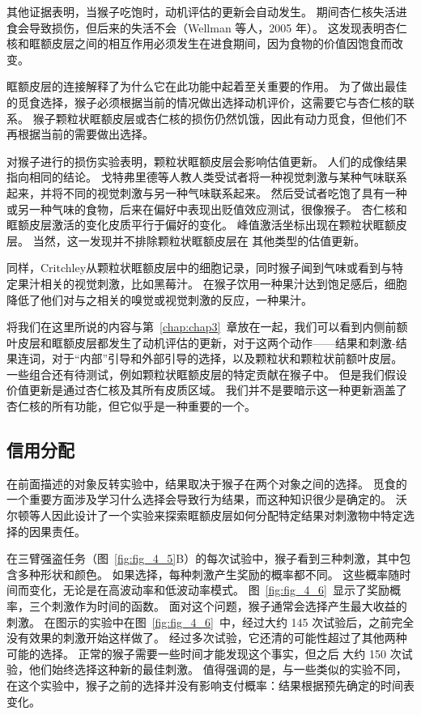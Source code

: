 其他证据表明，当猴子吃饱时，动机评估的更新会自动发生。
期间杏仁核失活进食会导致损伤，但后来的失活不会（Wellman 等人，2005 年）。
这发现表明杏仁核和眶额皮层之间的相互作用必须发生在进食期间，因为食物的价值因饱食而改变。\par


眶额皮层的连接解释了为什么它在此功能中起着至关重要的作用。
为了做出最佳的觅食选择，猴子必须根据当前的情况做出选择动机评价，这需要它与杏仁核的联系。
猴子颗粒状眶额皮层或杏仁核的损伤仍然饥饿，因此有动力觅食，但他们不再根据当前的需要做出选择。\par


对猴子进行的损伤实验表明，颗粒状眶额皮层会影响估值更新。
人们的成像结果指向相同的结论。
戈特弗里德等人\cite{gottfried2003encoding}教人类受试者将一种视觉刺激与某种气味联系起来，并将不同的视觉刺激与另一种气味联系起来。
然后受试者吃饱了具有一种或另一种气味的食物，后来在偏好中表现出贬值效应测试，很像猴子。
杏仁核和眶额皮层激活的变化皮质平行于偏好的变化。
峰值激活坐标出现在颗粒状眶额皮层。
当然，这一发现并不排除颗粒状眶额皮层在
其他类型的估值更新。\par


同样，Critchley\cite{critchley1996hunger}从颗粒状眶额皮层中的细胞记录，同时猴子闻到气味或看到与特定果汁相关的视觉刺激，比如黑莓汁。
在猴子饮用一种果汁达到饱足感后，细胞降低了他们对与之相关的嗅觉或视觉刺激的反应，一种果汁。\par


将我们在这里所说的内容与第~\ref{chap:chap3}~章放在一起，我们可以看到内侧前额叶皮层和眶额皮层都发生了动机评估的更新，对于这两个动作——结果和刺激-结果连词，对于“内部”引导和外部引导的选择，以及颗粒状和颗粒状前额叶皮层。
一些组合还有待测试，例如颗粒状眶额皮层的特定贡献在猴子中。
但是我们假设价值更新是通过杏仁核及其所有皮质区域。
我们并不是要暗示这一种更新涵盖了杏仁核的所有功能，但它似乎是一种重要的一个。\par



\subsection{信用分配}

在前面描述的对象反转实验中，结果取决于猴子在两个对象之间的选择。
觅食的一个重要方面涉及学习什么选择会导致行为结果，而这种知识很少是确定的。
沃尔顿等人\cite{walton2010separable}因此设计了一个实验来探索眶额皮层如何分配特定结果对刺激物中特定选择的因果责任。\par


在三臂强盗任务（图~\ref{fig:fig_4_5}B）的每次试验中，猴子看到三种刺激，其中包含多种形状和颜色。
如果选择，每种刺激产生奖励的概率都不同。
这些概率随时间而变化，无论是在高波动率和低波动率模式。
图~\ref{fig:fig_4_6}~显示了奖励概率，三个刺激作为时间的函数。
面对这个问题，猴子通常会选择产生最大收益的刺激。
在图示的实验中在图~\ref{fig:fig_4_6}~中，经过大约 145 次试验后，之前完全没有效果的刺激开始这样做了。
经过多次试验，它还清的可能性超过了其他两种可能的选择。
正常的猴子需要一些时间才能发现这个事实，但之后
大约 150 次试验，他们始终选择这种新的最佳刺激。
值得强调的是，与一些类似的实验不同，在这个实验中，猴子之前的选择并没有影响支付概率：结果根据预先确定的时间表变化。\par


